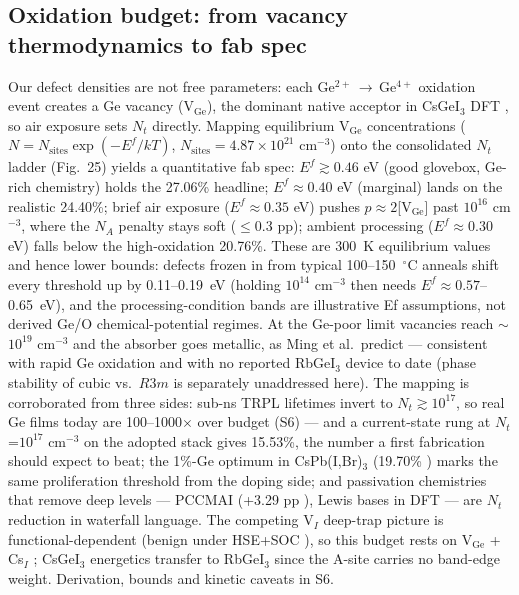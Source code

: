 \documentclass[review]{elsarticle}
\begin{document}
\subsection{Oxidation budget: from vacancy thermodynamics to fab spec}
Our defect densities are not free parameters: each Ge$^{2+}$\,$\rightarrow$\,Ge$^{4+}$ oxidation event creates a Ge vacancy (V$_{\mathrm{Ge}}$), the dominant native acceptor in CsGeI$_{3}$ DFT \cite{rMing}, so air exposure sets $N_{t}$ directly. Mapping equilibrium V$_{\mathrm{Ge}}$ concentrations ($N=N_{\mathrm{sites}}\exp(-E^f/kT)$, $N_{\mathrm{sites}}=4.87\times10^{21}$ cm$^{-3}$) onto the consolidated $N_{t}$ ladder (Fig.~25) yields a quantitative fab spec: $E^f\gtrsim0.46$ eV (good glovebox, Ge-rich chemistry) holds the 27.06\% headline; $E^f\approx0.40$ eV (marginal) lands on the realistic 24.40\%; brief air exposure ($E^f\approx0.35$ eV) pushes $p\approx2$[V$_{\mathrm{Ge}}$] past $10^{16}$ cm$^{-3}$, where the $N_{A}$ penalty stays soft ($\le$0.3 pp); ambient processing ($E^f\approx0.30$ eV) falls below the high-oxidation 20.76\%. These are 300~K equilibrium values and hence lower bounds: defects frozen in from typical 100--150~$^{\circ}$C anneals shift every threshold up by 0.11--0.19~eV (holding $10^{14}$ cm$^{-3}$ then needs $E^f\approx0.57$--0.65~eV), and the processing-condition bands are illustrative Ef assumptions, not derived Ge/O chemical-potential regimes. At the Ge-poor limit vacancies reach $\sim$$10^{19}$ cm$^{-3}$ and the absorber goes metallic, as Ming et al.\ predict \cite{rMing} --- consistent with rapid Ge oxidation \cite{rThirumal} and with no reported RbGeI$_{3}$ device to date (phase stability of cubic vs.\ $R3m$ is separately unaddressed here). The mapping is corroborated from three sides: sub-ns TRPL lifetimes invert to $N_{t}\gtrsim10^{17}$, so real Ge films today are 100--1000$\times$ over budget \cite{rGeRev} (S6) --- and a current-state rung at $N_{t}$=$10^{17}$ cm$^{-3}$ on the adopted stack gives 15.53\%, the number a first fabrication should expect to beat; the 1\%-Ge optimum in CsPb(I,Br)$_{3}$ (19.70\% \cite{rGeDope}) marks the same proliferation threshold from the doping side; and passivation chemistries that remove deep levels --- PCCMAI (+3.29 pp \cite{rPCCMAI}), Lewis bases in DFT \cite{rKino} --- are $N_{t}$ reduction in waterfall language. The competing V$_{I}$ deep-trap picture is functional-dependent (benign under HSE+SOC \cite{rZhangPRX}), so this budget rests on V$_{\mathrm{Ge}}$ + Cs$_{I}$ \cite{rZhang24}; CsGeI$_{3}$ energetics transfer to RbGeI$_{3}$ since the A-site carries no band-edge weight. Derivation, bounds and kinetic caveats in S6.
\end{document}
